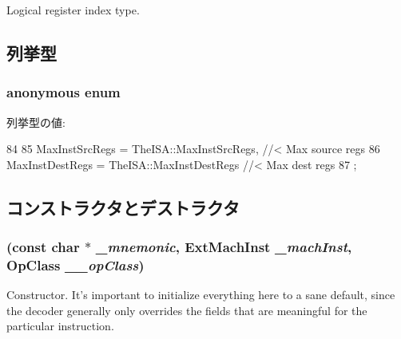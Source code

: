 Logical register index type. 

\subsection{列挙型}
\hypertarget{classStaticInst_a16685eea158879e41b101ca3634de462}{
\subsubsection[{"@39}]{\setlength{\rightskip}{0pt plus 5cm}anonymous enum}}
\label{classStaticInst_a16685eea158879e41b101ca3634de462}
\begin{Desc}
\item[列挙型の値: ]\par
\begin{description}
\item[{\em 
\hypertarget{classStaticInst_a16685eea158879e41b101ca3634de462a17b78fe104e3bf28fca535a040514084}{
MaxInstSrcRegs}
\label{classStaticInst_a16685eea158879e41b101ca3634de462a17b78fe104e3bf28fca535a040514084}
}]\item[{\em 
\hypertarget{classStaticInst_a16685eea158879e41b101ca3634de462a6a2e9b17a83d01eb4ee6bbdd739be9eb}{
MaxInstDestRegs}
\label{classStaticInst_a16685eea158879e41b101ca3634de462a6a2e9b17a83d01eb4ee6bbdd739be9eb}
}]\end{description}
\end{Desc}




\begin{DoxyCode}
84          {
85         MaxInstSrcRegs = TheISA::MaxInstSrcRegs,        //< Max source regs
86         MaxInstDestRegs = TheISA::MaxInstDestRegs       //< Max dest regs
87     };
\end{DoxyCode}


\subsection{コンストラクタとデストラクタ}
\hypertarget{classStaticInst_ac0187fed42aee18cd56cec8a03699653}{
\subsubsection[{StaticInst}]{ (const char $\ast$ {\em \_\-mnemonic}, \/  {\bf ExtMachInst} {\em \_\-machInst}, \/  OpClass {\em \_\-\_\-opClass})}}
\label{classStaticInst_ac0187fed42aee18cd56cec8a03699653}
Constructor. It's important to initialize everything here to a sane default, since the decoder generally only overrides the fields that are meaningful for the particular instruction. 


